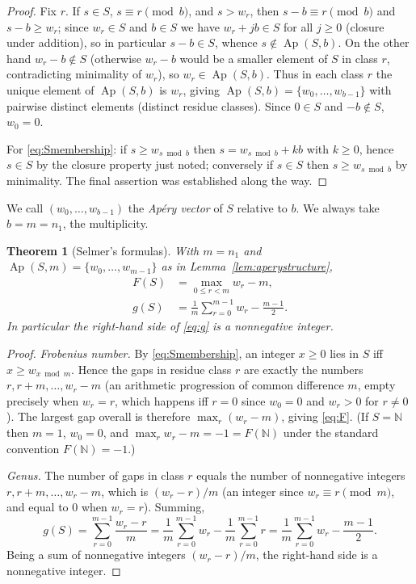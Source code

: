 \documentclass{amsart}
\newtheorem{theorem}{Theorem}
\theoremstyle{definition}
\DeclareMathOperator{\Ap}{Ap}
\newcommand{\NN}{\mathbb{N}}
\begin{document}
\begin{proof}
Fix $r$. If $s\in S$, $s\equiv r\pmod b$, and $s>w_r$, then
$s-b\equiv r\pmod b$ and $s-b\ge w_r$; since $w_r\in S$ and $b\in S$ we have
$w_r+jb\in S$ for all $j\ge0$ (closure under addition), so in particular
$s-b\in S$, whence $s\notin\Ap(S,b)$. On the other hand $w_r-b\notin S$
(otherwise $w_r-b$ would be a smaller element of $S$ in class $r$,
contradicting minimality of $w_r$), so $w_r\in\Ap(S,b)$. Thus in each class
$r$ the unique element of $\Ap(S,b)$ is $w_r$, giving
$\Ap(S,b)=\{w_0,\dots,w_{b-1}\}$ with pairwise distinct elements (distinct
residue classes). Since $0\in S$ and $-b\notin S$, $w_0=0$.

For \eqref{eq:Smembership}: if $s\ge w_{s\bmod b}$ then
$s=w_{s\bmod b}+kb$ with $k\ge0$, hence $s\in S$ by the closure property
just noted; conversely if $s\in S$ then $s\ge w_{s\bmod b}$ by minimality.
The final assertion was established along the way.
\end{proof}

We call $(w_0,\dots,w_{b-1})$ the \emph{Ap\'ery vector} of $S$ relative to
$b$. We always take $b=m=n_1$, the multiplicity.

\begin{theorem}[Selmer's formulas]\label{thm:selmer}
With $m=n_1$ and $\Ap(S,m)=\{w_0,\dots,w_{m-1}\}$ as in
Lemma~\ref{lem:aperystructure},
\begin{align}
F(S)&=\max_{0\le r<m} w_r-m,\label{eq:F}\\
g(S)&=\frac1m\sum_{r=0}^{m-1}w_r-\frac{m-1}{2}.\label{eq:g}
\end{align}
In particular the right-hand side of \eqref{eq:g} is a nonnegative integer.
\end{theorem}

\begin{proof}
\emph{Frobenius number.} By \eqref{eq:Smembership}, an integer $x\ge0$ lies
in $S$ iff $x\ge w_{x\bmod m}$. Hence the gaps in residue class $r$ are
exactly the numbers $r,r+m,\dots,w_r-m$ (an arithmetic progression of
common difference $m$, empty precisely when $w_r=r$, which happens iff
$r=0$ since $w_0=0$ and $w_r>0$ for $r\ne0$). The largest gap overall is
therefore $\max_r(w_r-m)$, giving \eqref{eq:F}. (If $S=\NN$ then $m=1$,
$w_0=0$, and $\max_r w_r-m=-1=F(\NN)$ under the standard convention
$F(\NN)=-1$.)

\emph{Genus.} The number of gaps in class $r$ equals the number of
nonnegative integers $r,r+m,\dots,w_r-m$, which is $(w_r-r)/m$ (an integer
since $w_r\equiv r\pmod m$, and equal to $0$ when $w_r=r$). Summing,
\[
g(S)=\sum_{r=0}^{m-1}\frac{w_r-r}{m}
=\frac1m\sum_{r=0}^{m-1}w_r-\frac1m\sum_{r=0}^{m-1}r
=\frac1m\sum_{r=0}^{m-1}w_r-\frac{m-1}{2}.
\]
Being a sum of nonnegative integers $(w_r-r)/m$, the right-hand side is a
nonnegative integer.
\end{proof}
\end{document}
